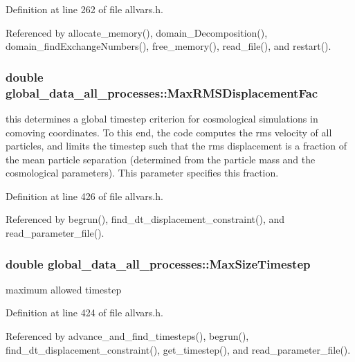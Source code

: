 Definition at line 262 of file allvars.h.



Referenced by allocate\_\-memory(), domain\_\-Decomposition(), domain\_\-findExchangeNumbers(), free\_\-memory(), read\_\-file(), and restart().

\hypertarget{structglobal__data__all__processes_a988ecf1fcfe5e61ff9ac29792c816c24}{
\subsubsection[{MaxRMSDisplacementFac}]{\setlength{\rightskip}{0pt plus 5cm}double {\bf global\_\-data\_\-all\_\-processes::MaxRMSDisplacementFac}}}
\label{structglobal__data__all__processes_a988ecf1fcfe5e61ff9ac29792c816c24}
this determines a global timestep criterion for cosmological simulations in comoving coordinates. To this end, the code computes the rms velocity of all particles, and limits the timestep such that the rms displacement is a fraction of the mean particle separation (determined from the particle mass and the cosmological parameters). This parameter specifies this fraction. 

Definition at line 426 of file allvars.h.



Referenced by begrun(), find\_\-dt\_\-displacement\_\-constraint(), and read\_\-parameter\_\-file().

\hypertarget{structglobal__data__all__processes_a7303c9f6c34ee3befcac84043c8ec3ea}{
\subsubsection[{MaxSizeTimestep}]{\setlength{\rightskip}{0pt plus 5cm}double {\bf global\_\-data\_\-all\_\-processes::MaxSizeTimestep}}}
\label{structglobal__data__all__processes_a7303c9f6c34ee3befcac84043c8ec3ea}
maximum allowed timestep 

Definition at line 424 of file allvars.h.



Referenced by advance\_\-and\_\-find\_\-timesteps(), begrun(), find\_\-dt\_\-displacement\_\-constraint(), get\_\-timestep(), and read\_\-parameter\_\-file().

